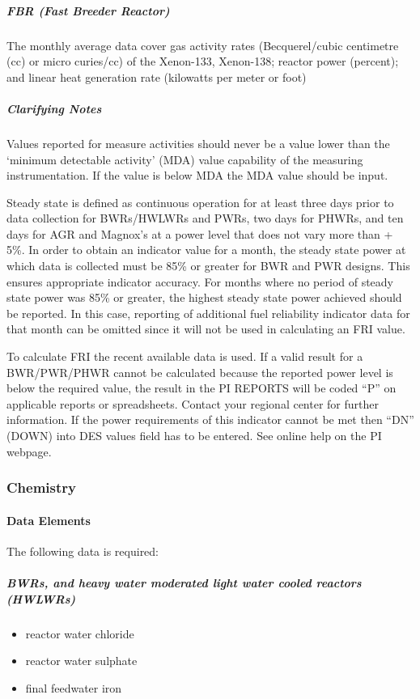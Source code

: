 \subparagraph{FBR (Fast Breeder Reactor)}

The monthly average data cover gas activity rates (Becquerel/cubic
centimetre (cc) or micro curies/cc) of the Xenon-133, Xenon-138;
reactor power (percent); and linear heat generation rate (kilowatts
per meter or foot)

\subparagraph{Clarifying Notes}

Values reported for measure activities should never be a value lower
than the ‘minimum detectable activity’ (MDA) value capability of the
measuring instrumentation. If the value is below MDA the MDA value
should be input.

Steady state is defined as continuous operation for at least three
days prior to data collection for BWRs/HWLWRs and PWRs, two days for
PHWRs, and ten days for AGR and Magnox's at a power level that does
not vary more than + 5\%.   In order to obtain an indicator value for
a month, the steady state power at which data is collected must be
85\% or greater for BWR and PWR designs. This ensures appropriate
indicator accuracy. For months where no period of steady state power
was 85\% or greater, the highest steady state power achieved should be
reported. In this case, reporting of additional fuel reliability
indicator data for that month can be omitted since it will not be used
in calculating an FRI value.

To calculate FRI the recent available data is used. If a valid result
for a BWR/PWR/PHWR cannot be calculated because the reported power
level is below the required value, the result in the PI REPORTS will
be coded “P” on applicable reports or spreadsheets. Contact your
regional center for further information. If the power requirements of
this indicator cannot be met then “DN” (DOWN) into DES values field
has to be entered. See online help on the PI webpage.

\subsubsection{Chemistry}

\paragraph{Data Elements}

The following data is required:

\subparagraph{BWRs, and heavy water moderated light water cooled reactors (HWLWRs)}
\begin{itemize}
\item reactor water chloride
\item reactor water sulphate
\item final feedwater iron
\end{itemize}

